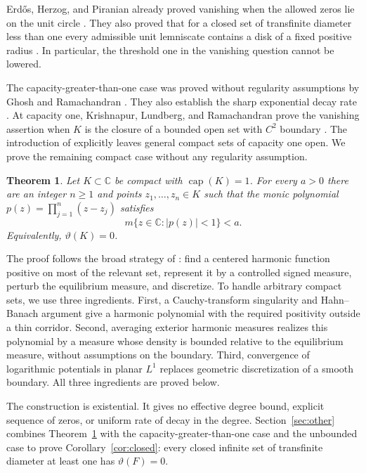 \documentclass[11pt]{article}
\newcommand{\C}{\mathbb C}
\DeclareMathOperator{\caplog}{cap}
\newtheorem{theorem}{Theorem}[section]
\theoremstyle{remark}
\numberwithin{equation}{section}
\begin{document}
Erd\H{o}s, Herzog, and Piranian already proved vanishing when the
allowed zeros lie on the unit circle
\cite[Theorem~4 and its corollary, p.~133]{EHP1958}. They also proved
that for a closed set of transfinite diameter less than one every
admissible unit lemniscate contains a disk of a fixed positive radius
\cite[Theorem~6, p.~135]{EHP1958}. In particular, the threshold one
in the vanishing question cannot be lowered.

The capacity-greater-than-one case was proved without regularity
assumptions by Ghosh and Ramachandran \cite[Theorem~3.1]{GR2026}.
They also establish the sharp exponential decay rate
\cite[Theorem~3.3]{GR2026}. At capacity one, Krishnapur, Lundberg, and
Ramachandran prove the vanishing assertion when $K$ is the closure of a
bounded open set with $C^2$ boundary \cite[Theorem~6]{KLR2025}.
The introduction of \cite[version~3, 27 August 2026]{GR2026}
explicitly leaves general compact sets of capacity one open.
We prove the remaining compact case without any regularity assumption.

\begin{theorem}\label{thm:main}
Let $K\subset\C$ be compact with $\caplog(K)=1$. For every $a>0$
there are an integer $n\ge1$ and points $z_1,\ldots,z_n\in K$ such that
the monic polynomial $p(z)=\prod_{j=1}^n(z-z_j)$ satisfies
\[
 m\{z\in\C:|p(z)|<1\}<a.
\]
Equivalently, $\vartheta(K)=0$.
\end{theorem}

The proof follows the broad strategy of \cite[Section~5]{KLR2025}:
find a centered harmonic function positive on most of the relevant set,
represent it by a controlled signed measure, perturb the equilibrium
measure, and discretize. To handle arbitrary compact sets, we use
three ingredients.
First, a Cauchy-transform singularity and Hahn--Banach argument give a
harmonic polynomial with the required positivity outside a thin corridor.
Second, averaging exterior harmonic measures realizes this polynomial
by a measure whose density is bounded relative to the equilibrium
measure, without assumptions on the boundary. Third, convergence of
logarithmic potentials in planar $L^1$ replaces geometric discretization
of a smooth boundary. All three ingredients are proved below.

The construction is existential. It gives no effective degree bound,
explicit sequence of zeros, or uniform rate of decay in the degree.
Section~\ref{sec:other} combines Theorem~\ref{thm:main} with the
capacity-greater-than-one case and the unbounded case to prove
Corollary~\ref{cor:closed}: every closed infinite set of transfinite
diameter at least one has $\vartheta(F)=0$.
\end{document}
